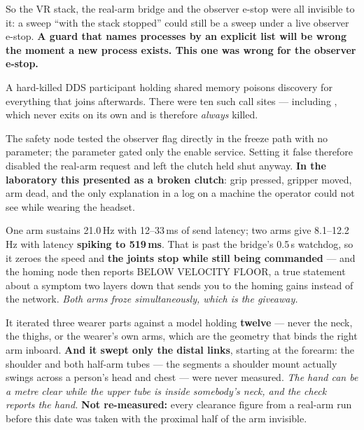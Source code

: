 {So the VR stack, the real-arm bridge and the observer e-stop were all invisible
to it: a sweep ``with the stack stopped'' could still be a sweep under a live
observer e-stop. \textbf{A guard that names processes by an explicit list will be
wrong the moment a new process exists. This one was wrong for the observer
e-stop.}}

{A hard-killed DDS participant holding shared memory poisons discovery for
everything that joins afterwards. There were ten such call sites --- including
, which never exits on its own and is therefore
\emph{always} killed.}

{The safety node tested the observer flag directly in the freeze path with no
parameter; the parameter gated only the enable service. Setting it false
therefore disabled the real-arm request and left the clutch held shut anyway.
\textbf{In the laboratory this presented as a broken clutch}: grip pressed,
gripper moved, arm dead, and the only explanation in a log on a machine the
operator could not see while wearing the headset.}

{One arm sustains 21.0\,Hz with 12--33\,ms of send latency; two arms give
8.1--12.2\,Hz with latency \textbf{spiking to 519\,ms}. That is past the bridge's
0.5\,s watchdog, so it zeroes the speed and \textbf{the joints stop while still
being commanded} --- and the homing node then reports BELOW VELOCITY FLOOR, a
true statement about a symptom two layers down that sends you to the homing gains
instead of the network. \emph{Both arms froze simultaneously, which is the
giveaway.}}

{It iterated three wearer parts against a model holding \textbf{twelve} --- never
the neck, the thighs, or the wearer's own arms, which are the geometry that binds
the right arm inboard. \textbf{And it swept only the distal links}, starting at
the forearm: the shoulder and both half-arm tubes --- the segments a shoulder
mount actually swings across a person's head and chest --- were never measured.
\emph{The hand can be a metre clear while the upper tube is inside somebody's
neck, and the check reports the hand.} \textbf{Not re-measured:} every clearance
figure from a real-arm run before this date was taken with the proximal half of
the arm invisible.}

